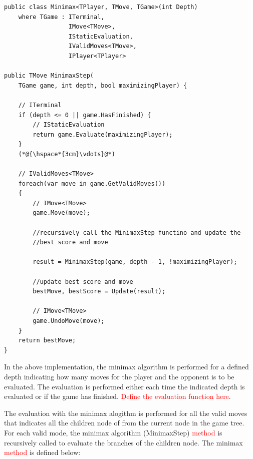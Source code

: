 \begin{lstlisting}
public class Minimax<TPlayer, TMove, TGame>(int Depth)
    where TGame : ITerminal,
                  IMove<TMove>,
                  IStaticEvaluation,
                  IValidMoves<TMove>,
                  IPlayer<TPlayer>

public TMove MinimaxStep(
    TGame game, int depth, bool maximizingPlayer) {
    
    // ITerminal
    if (depth <= 0 || game.HasFinished) {
        // IStaticEvaluation
        return game.Evaluate(maximizingPlayer);
    }
    (*@{\hspace*{3cm}\vdots}@*)
    
    // IValidMoves<TMove>
    foreach(var move in game.GetValidMoves())
    {
        // IMove<TMove>
        game.Move(move);

        //recursively call the MinimaxStep functino and update the
        //best score and move
        
        result = MinimaxStep(game, depth - 1, !maximizingPlayer);

        //update best score and move
        bestMove, bestScore = Update(result);
        
        // IMove<TMove>
        game.UndoMove(move);
    }
    return bestMove;
}
\end{lstlisting}

In the above implementation, the minimax algorithm is performed for a defined depth indicating how many moves for the player and the opponent is to be evaluated. The evaluation is performed either each time the indicated depth is evaluated or if the game has finished. \textcolor{red}{Define the evaluation function here}.

The evaluation with the minimax alogithm is performed for all the valid moves that indicates all the children node of from the current node in the game tree. For each valid mode, the minimax algorithm (MinimaxStep) \textcolor{red}{method} is recursively called to evaluate the branches of the children node. The minimax \textcolor{red}{method} is defined below:  

